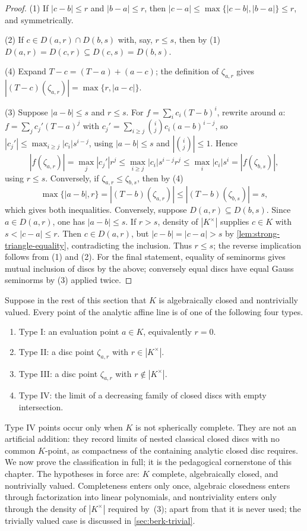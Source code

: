 \begin{proof}
(1) If $|c-b|\leq r$ and $|b-a|\leq r$, then
$|c-a|\leq\max\{|c-b|,|b-a|\}\leq r$, and symmetrically.

(2) If $c\in D(a,r)\cap D(b,s)$ with, say, $r\leq s$, then by (1)
$D(a,r)=D(c,r)\subseteq D(c,s)=D(b,s)$.

(4) Expand $T-c=(T-a)+(a-c)$; the definition of $\zeta_{a,r}$ gives
$|(T-c)(\zeta_{a,r})|=\max\{r,|a-c|\}$.

(3) Suppose $|a-b|\leq s$ and $r\leq s$.  For
$f=\sum_ic_i(T-b)^i$, rewrite around $a$:
$f=\sum_jc_j'(T-a)^j$ with
$c_j'=\sum_{i\geq j}\binom{i}{j}c_i(a-b)^{i-j}$, so
$|c_j'|\leq\max_{i\geq j}|c_i|s^{i-j}$, using $|a-b|\le s$ and
$|\binom ij|\le1$.  Hence
\[
 |f(\zeta_{a,r})|=\max_j|c_j'|r^j
 \leq\max_{i\geq j}|c_i|s^{i-j}r^j
 \leq\max_i|c_i|s^i=|f(\zeta_{b,s})|,
\]
using $r\leq s$.  Conversely, if $\zeta_{a,r}\leq\zeta_{b,s}$, then
by (4)
\[
 \max\{|a-b|,r\}=|(T-b)(\zeta_{a,r})|\leq|(T-b)(\zeta_{b,s})|=s,
\]
which gives both inequalities. Conversely, suppose
$D(a,r)\subseteq D(b,s)$. Since $a\in D(a,r)$, one has $|a-b|\leq s$.
If $r>s$, density of $|K^\times|$ supplies $c\in K$ with
$s<|c-a|\leq r$. Then $c\in D(a,r)$, but
$|c-b|=|c-a|>s$ by \cref{lem:strong-triangle-equality}, contradicting
the inclusion. Thus $r\leq s$; the reverse implication follows from
(1) and (2). For the final statement, equality of seminorms gives
mutual inclusion of discs by the above; conversely equal discs have
equal Gauss seminorms by (3) applied twice.
\end{proof}

Suppose in the rest of this section that $K$ is algebraically closed and
nontrivially valued. Every point of the analytic affine line is of one of
the following four types.
\begin{enumerate}
\item Type I: an evaluation point $a\in K$, equivalently $r=0$.
\item Type II: a disc point $\zeta_{a,r}$ with
      $r\in |K^\times|$.
\item Type III: a disc point $\zeta_{a,r}$ with
      $r\notin |K^\times|$.
\item Type IV: the limit of a decreasing family of closed discs with empty
      intersection.
\end{enumerate}
Type IV points occur only when $K$ is not spherically complete. They are
not an artificial addition: they record limits of nested classical closed
discs with no common $K$-point, as compactness of the containing analytic
closed disc requires. We now prove the classification in
full; it is the pedagogical cornerstone of this chapter.  The hypotheses
in force are: $K$ complete, algebraically closed, and nontrivially
valued.  Completeness enters only once, algebraic closedness enters
through factorization into linear polynomials, and nontriviality enters
only through the density of $|K^\times|$ required by
\,(3); apart from that it is never
used; the trivially valued case is discussed in
\cref{sec:berk-trivial}.

